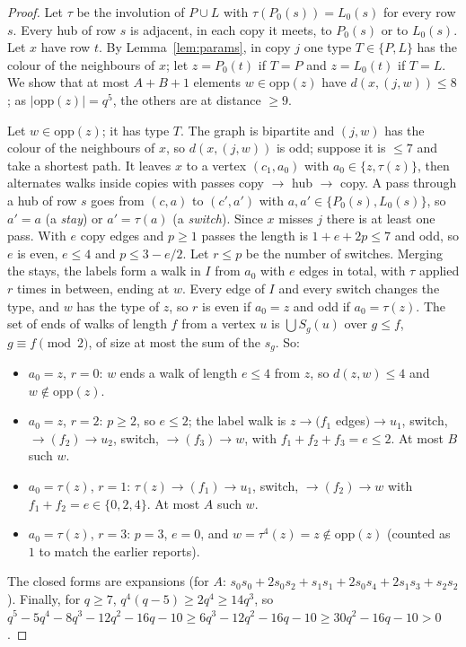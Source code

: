 \documentclass[11pt]{amsart}
\theoremstyle{plain}
\theoremstyle{definition}
\theoremstyle{remark}
\newcommand{\opp}{\mathrm{opp}}
\newcommand{\pP}{P}  %
\newcommand{\lL}{L}  %
\begin{document}
\begin{proof}
Let $\tau$ be the involution of $\pP \cup \lL$ with $\tau(P_0(s)) = L_0(s)$ for every row $s$. Every hub of row $s$ is
adjacent, in each copy it meets, to $P_0(s)$ or to $L_0(s)$. Let $x$ have row $t$. By Lemma~\ref{lem:params}, in copy $j$
one type $T \in \{\pP, \lL\}$ has the colour of the neighbours of $x$; let $z = P_0(t)$ if $T = \pP$ and $z = L_0(t)$ if
$T = \lL$. We show that at most $A + B + 1$ elements $w \in \opp(z)$ have $d(x,(j,w)) \le 8$; as $|\opp(z)| = q^5$, the
others are at distance $\ge 9$.

Let $w \in \opp(z)$; it has type $T$. The graph is bipartite and $(j,w)$ has the colour of the neighbours of $x$, so
$d(x,(j,w))$ is odd; suppose it is $\le 7$ and take a shortest path. It leaves $x$ to a vertex $(c_1, a_0)$ with
$a_0 \in \{z, \tau(z)\}$, then alternates walks inside copies with passes copy $\to$ hub $\to$ copy. A pass through a hub
of row $s$ goes from $(c, a)$ to $(c', a')$ with $a, a' \in \{P_0(s), L_0(s)\}$, so $a' = a$ (a \emph{stay}) or
$a' = \tau(a)$ (a \emph{switch}). Since $x$ misses $j$ there is at least one pass. With $e$ copy edges and $p \ge 1$
passes the length is $1 + e + 2p \le 7$ and odd, so $e$ is even, $e \le 4$ and $p \le 3 - e/2$. Let $r \le p$ be the
number of switches. Merging the stays, the labels form a walk in $I$ from $a_0$ with $e$ edges in total, with $\tau$
applied $r$ times in between, ending at $w$. Every edge of $I$ and every switch changes the type, and $w$ has the type of
$z$, so $r$ is even if $a_0 = z$ and odd if $a_0 = \tau(z)$. The set of ends of walks of length $f$ from a vertex $u$ is
$\bigcup S_g(u)$ over $g \le f$, $g \equiv f \pmod 2$, of size at most the sum of the $s_g$. So:
\begin{itemize}[leftmargin=1.5em]
\item $a_0 = z$, $r = 0$: $w$ ends a walk of length $e \le 4$ from $z$, so $d(z,w) \le 4$ and $w \notin \opp(z)$.
\item $a_0 = z$, $r = 2$: $p \ge 2$, so $e \le 2$; the label walk is $z \to (f_1$ edges$) \to u_1$, switch,
  $\to (f_2) \to u_2$, switch, $\to (f_3) \to w$, with $f_1 + f_2 + f_3 = e \le 2$. At most $B$ such $w$.
\item $a_0 = \tau(z)$, $r = 1$: $\tau(z) \to (f_1) \to u_1$, switch, $\to (f_2) \to w$ with $f_1 + f_2 = e \in \{0,2,4\}$.
  At most $A$ such $w$.
\item $a_0 = \tau(z)$, $r = 3$: $p = 3$, $e = 0$, and $w = \tau^4(z) = z \notin \opp(z)$ (counted as $1$ to match the
  earlier reports).
\end{itemize}
The closed forms are expansions (for $A$: $s_0s_0 + 2s_0s_2 + s_1s_1 + 2s_0s_4 + 2s_1s_3 + s_2s_2$). Finally, for
$q \ge 7$, $q^4(q-5) \ge 2q^4 \ge 14q^3$, so
$q^5 - 5q^4 - 8q^3 - 12q^2 - 16q - 10 \ge 6q^3 - 12q^2 - 16q - 10 \ge 30q^2 - 16q - 10 > 0$.
\end{proof}
\end{document}
